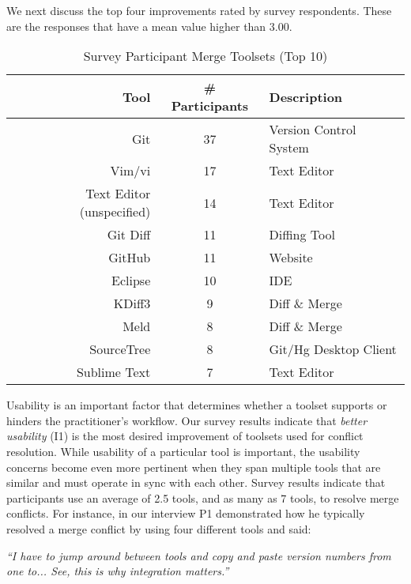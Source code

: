 We next discuss the top four improvements rated by survey respondents. These are the responses that have a mean value higher than $3.00$.

\begin{table}[!htbp]
\renewcommand{\arraystretch}{1.3}
\caption{Survey Participant Merge Toolsets (Top 10)}
\label{survey_toolset}
\centering
\begin{tabularx}{0.45\textwidth}{@{}r|Cl@{}}
\toprule
Tool & \# Participants & Description\\
\midrule
Git	& 37 & Version Control System\\
Vim/vi & 17 & Text Editor\\
Text Editor (unspecified) & 14 & Text Editor\\
Git Diff & 11 & Diffing Tool\\
GitHub & 11 & Website\\
Eclipse & 10 & IDE\\
KDiff3 & 9 & Diff \& Merge\\
Meld & 8 & Diff \& Merge\\
SourceTree & 8 & Git/Hg Desktop Client\\
Sublime Text & 7 & Text Editor\\
\bottomrule
\end{tabularx}
\end{table}

Usability is an important factor that determines whether a toolset supports or hinders the practitioner's workflow.
Our survey results indicate that \textit{better usability} (I1) is the most desired improvement of toolsets used for conflict resolution. 
While usability of a particular tool is important, the usability concerns become even more pertinent when they span multiple tools that are similar and must operate in sync with each other.
Survey results indicate that participants use an average of 2.5 tools, and as many as 7 tools, to resolve merge conflicts.
For instance, in our interview P1 demonstrated how he typically resolved a merge conflict by using four different tools and said: 
\begin{displayquote}
\textit{``I have to jump around between tools and copy and paste version numbers from one to... See, this is why integration matters.''}
\end{displayquote}

